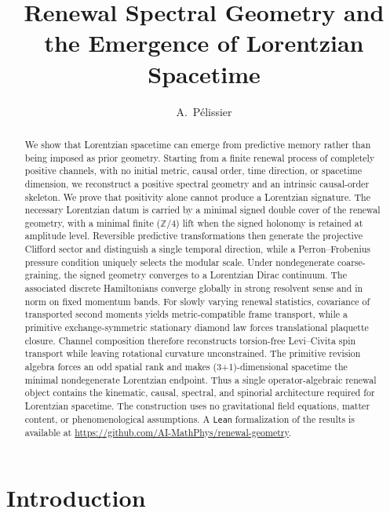 \documentclass[11pt]{article}
\title{\textbf{Renewal Spectral Geometry and the Emergence of Lorentzian Spacetime}}
\author{A.~P\'elissier}
\date{}
\theoremstyle{definition}
\theoremstyle{remark}
\begin{document}
\maketitle




\begin{abstract}
We show that Lorentzian spacetime can emerge from predictive memory rather than being imposed as prior geometry.  Starting from a finite renewal process of completely positive channels, with no initial metric, causal order, time direction, or spacetime dimension, we reconstruct a positive spectral geometry and an intrinsic causal-order skeleton.  We prove that positivity alone cannot produce a Lorentzian signature.  The necessary Lorentzian datum is carried by a minimal signed double cover of the renewal geometry, with a minimal finite ($\mathbb Z/4$) lift when the signed holonomy is retained at amplitude level.  Reversible predictive transformations then generate the projective Clifford sector and distinguish a single temporal direction, while a Perron--Frobenius pressure condition uniquely selects the modular scale.
%
Under nondegenerate coarse-graining, the signed geometry converges to a Lorentzian Dirac continuum.  The associated discrete Hamiltonians converge globally in strong resolvent sense and in norm on fixed momentum bands.  For slowly varying renewal statistics, covariance of transported second moments yields metric-compatible frame transport, while a primitive exchange-symmetric stationary diamond law forces translational plaquette closure.  Channel composition therefore reconstructs torsion-free Levi--Civita spin transport while leaving rotational curvature unconstrained.  The primitive revision algebra forces an odd spatial rank and makes (3+1)-dimensional spacetime the minimal nondegenerate Lorentzian endpoint.
%
Thus a single operator-algebraic renewal object contains the kinematic, causal, spectral, and spinorial architecture required for Lorentzian spacetime.  The construction uses no gravitational field equations, matter content, or phenomenological assumptions.
%
A \texttt{Lean} formalization of the results is available at
\url{https://github.com/AI-MathPhys/renewal-geometry}.
\end{abstract}



\setcounter{tocdepth}{2}
\tableofcontents

 
\section{Introduction}
\label{sec:intro}
\end{document}

